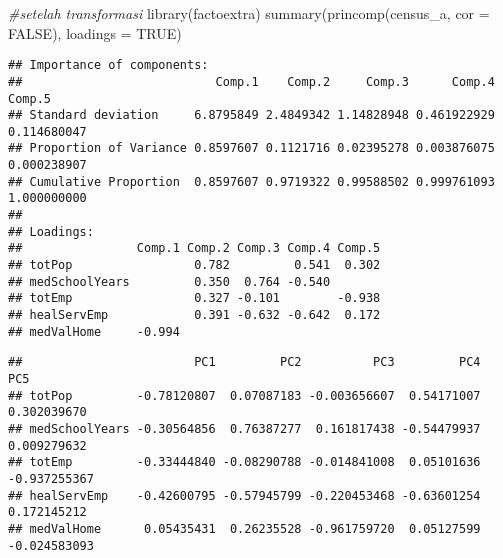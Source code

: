\documentclass[
]{article}
\newenvironment{Shaded}{\begin{snugshade}}{\end{snugshade}}
\newcommand{\AttributeTok}[1]{\textcolor[rgb]{0.77,0.63,0.00}{#1}}
\newcommand{\CommentTok}[1]{\textcolor[rgb]{0.56,0.35,0.01}{\textit{#1}}}
\newcommand{\ConstantTok}[1]{\textcolor[rgb]{0.00,0.00,0.00}{#1}}
\newcommand{\FunctionTok}[1]{\textcolor[rgb]{0.00,0.00,0.00}{#1}}
\newcommand{\NormalTok}[1]{#1}
\newcommand{\SpecialCharTok}[1]{\textcolor[rgb]{0.00,0.00,0.00}{#1}}
\begin{document}
\begin{Shaded}
\begin{Highlighting}[]
\CommentTok{\#setelah transformasi}
\FunctionTok{library}\NormalTok{(factoextra)}
\FunctionTok{summary}\NormalTok{(}\FunctionTok{princomp}\NormalTok{(census\_a, }\AttributeTok{cor =} \ConstantTok{FALSE}\NormalTok{), }\AttributeTok{loadings =} \ConstantTok{TRUE}\NormalTok{)}
\end{Highlighting}
\end{Shaded}

\begin{verbatim}
## Importance of components:
##                           Comp.1    Comp.2     Comp.3      Comp.4      Comp.5
## Standard deviation     6.8795849 2.4849342 1.14828948 0.461922929 0.114680047
## Proportion of Variance 0.8597607 0.1121716 0.02395278 0.003876075 0.000238907
## Cumulative Proportion  0.8597607 0.9719322 0.99588502 0.999761093 1.000000000
## 
## Loadings:
##                Comp.1 Comp.2 Comp.3 Comp.4 Comp.5
## totPop                 0.782         0.541  0.302
## medSchoolYears         0.350  0.764 -0.540       
## totEmp                 0.327 -0.101        -0.938
## healServEmp            0.391 -0.632 -0.642  0.172
## medValHome     -0.994
\end{verbatim}

\begin{Shaded}
\end{Shaded}

\begin{verbatim}
##                        PC1         PC2          PC3         PC4          PC5
## totPop         -0.78120807  0.07087183 -0.003656607  0.54171007  0.302039670
## medSchoolYears -0.30564856  0.76387277  0.161817438 -0.54479937  0.009279632
## totEmp         -0.33444840 -0.08290788 -0.014841008  0.05101636 -0.937255367
## healServEmp    -0.42600795 -0.57945799 -0.220453468 -0.63601254  0.172145212
## medValHome      0.05435431  0.26235528 -0.961759720  0.05127599 -0.024583093
\end{verbatim}

\begin{Shaded}
\end{Shaded}
\end{document}
